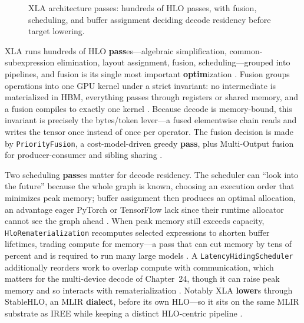 \begin{figure}[t]
\centering
{}
\caption{XLA architecture passes: hundreds of HLO passes, with fusion, scheduling, and buffer assignment deciding decode residency before target lowering.}
\label{fig:xla_arch_passes_architecture}
\end{figure}

XLA runs hundreds of HLO \textbf{pass}es---algebraic simplification, common-subexpression elimination, layout assignment, fusion, scheduling---grouped into pipelines, and fusion is its single most important \textbf{optim}ization \citep{openxla2024}. Fusion groups operations into one GPU kernel under a strict invariant: no intermediate is materialized in HBM, everything passes through registers or shared memory, and a fusion compiles to exactly one kernel \citep{openxla2024}. Because decode is memory-bound, this invariant is precisely the bytes/token lever---a fused elementwise chain reads and writes the tensor once instead of once per operator. The fusion decision is made by \texttt{PriorityFusion}, a cost-model-driven greedy \textbf{pass}, plus Multi-Output fusion for producer-consumer and sibling sharing \citep{openxla2024}.

Two scheduling \textbf{pass}es matter for decode residency. The scheduler can ``look into the future'' because the whole graph is known, choosing an execution order that minimizes peak memory; buffer assignment then produces an optimal allocation, an advantage eager PyTorch or TensorFlow lack since their runtime allocator cannot see the graph ahead \citep{openxla2024}. When peak memory still exceeds capacity, \texttt{HloRematerialization} recomputes selected expressions to shorten buffer lifetimes, trading compute for memory---a pass that can cut memory by tens of percent and is required to run many large models \citep{openxla2024}. A \texttt{LatencyHidingScheduler} additionally reorders work to overlap compute with communication, which matters for the multi-device decode of Chapter~24, though it can raise peak memory and so interacts with rematerialization \citep{openxla2024,patel2025llminference}. Notably XLA \textbf{lower}s through StableHLO, an MLIR \textbf{dialect}, before its own HLO---so it sits on the same MLIR substrate as IREE while keeping a distinct HLO-centric pipeline \citep{lai2023relax,openxla2024}.

